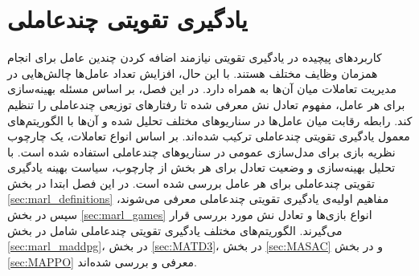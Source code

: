 \chapter{یادگیری تقویتی چندعاملی}
کاربردهای پیچیده در یادگیری تقویتی نیازمند اضافه کردن چندین عامل برای انجام همزمان وظایف مختلف هستند.
با این حال، افزایش تعداد عامل‌ها چالش‌هایی در مدیریت تعاملات میان آن‌ها به همراه دارد.
در این فصل، بر اساس مسئله بهینه‌سازی برای هر عامل، مفهوم تعادل نش معرفی شده تا رفتارهای توزیعی چندعاملی را تنظیم کند.
رابطه رقابت میان عامل‌ها در سناریوهای مختلف تحلیل شده و آن‌ها با الگوریتم‌های معمول یادگیری تقویتی چندعاملی ترکیب شده‌اند. بر اساس انواع تعاملات، یک چارچوب نظریه بازی برای مدل‌سازی عمومی در سناریوهای چندعاملی استفاده شده است. با تحلیل بهینه‌سازی و وضعیت تعادل برای هر بخش از چارچوب، سیاست بهینه یادگیری تقویتی چندعاملی برای هر عامل بررسی شده است. در این فصل ابتدا در بخش \ref{sec:marl_definitions} مفاهیم اولیه‌ی یادگیری تقویتی چندعاملی معرفی می‌شوند،
 سپس در بخش \ref{sec:marl_games} انواع بازی‌ها و تعادل نش مورد بررسی قرار می‌گیرند.
الگوریتم‌های مختلف یادگیری تقویتی چندعاملی شامل
 در بخش
  \ref{sec:marl_maddpg}،
    در بخش \ref{sec:MATD3}،
     در بخش \ref{sec:MASAC} و  در بخش \ref{sec:MAPPO} معرفی و بررسی شده‌اند.
  
    
    
    
    
    
    
     
